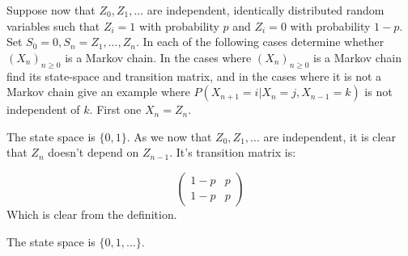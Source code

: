 Suppose now that $Z_0,Z_1,...$ are independent, identically distributed random variables such that $Z_i=1$ with probability $p$ and $Z_i=0$ with probability $1-p$. Set $S_0=0, S_n=Z_1,...,Z_n$. In each of the following cases determine whether $(X_n)_{n \geq 0}$ is a Markov chain. In the cases where $(X_n)_{n \geq 0}$ is a Markov chain find its state-space and transition matrix, and in the cases where it is not a Markov chain give an example where $P(X_{n+1}=i |X_n=j, X_{n-1} =k)$ is not independent of $k$. First one $X_n=Z_n$.

\beginproof
The state space is $\{0,1\}$. As we now that $Z_0,Z_1,...$ are independent, it is clear that $Z_n$ doesn't depend on $Z_{n-1}$. It's transition matrix is:

\[\begin{pmatrix}
1-p & p\\ 
1-p & p
\end{pmatrix}\]
Which is clear from the definition.\endproof


\beginproof
The state space is $\{0,1,...\}$.
\endproof